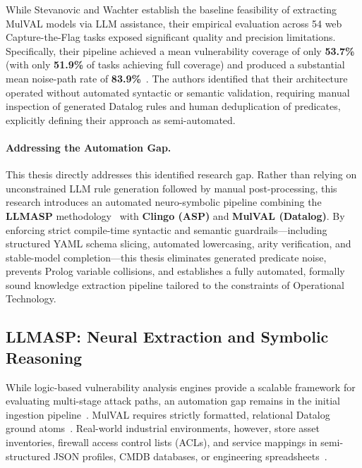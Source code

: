 \documentclass[target=mst,aauheader=aics,style=]{thud}
\begin{document}
While Stevanovic and Wachter establish the baseline feasibility of extracting MulVAL models via LLM assistance, their empirical evaluation across 54 web Capture-the-Flag tasks exposed significant quality and precision limitations. Specifically, their pipeline achieved a mean vulnerability coverage of only \textbf{53.7\%} (with only \textbf{51.9\%} of tasks achieving full coverage) and produced a substantial mean noise-path rate of \textbf{83.9\%}~\cite{StevanovicWachterRAISE}. The authors identified that their architecture operated without automated syntactic or semantic validation, requiring manual inspection of generated Datalog rules and human deduplication of predicates, explicitly defining their approach as semi-automated.

\paragraph{Addressing the Automation Gap.}
This thesis directly addresses this identified research gap. Rather than relying on unconstrained LLM rule generation followed by manual post-processing, this research introduces an automated neuro-symbolic pipeline combining the \textbf{LLMASP} methodology~\cite{alviano2025llmasp} with \textbf{Clingo (ASP)} and \textbf{MulVAL (Datalog)}. By enforcing strict compile-time syntactic and semantic guardrails---including structured YAML schema slicing, automated lowercasing, arity verification, and stable-model completion---this thesis eliminates generated predicate noise, prevents Prolog variable collisions, and establishes a fully automated, formally sound knowledge extraction pipeline tailored to the constraints of Operational Technology.

\subsection{LLMASP: Neural Extraction and Symbolic Reasoning}
\label{sec:llmasp_integration}
While logic-based vulnerability analysis engines provide a scalable framework for evaluating multi-stage attack paths, an automation gap remains in the initial ingestion pipeline~\cite{KonstaSurvey, StevanovicWachterRAISE}. MulVAL requires strictly formatted, relational Datalog ground atoms~\cite{Ou05}. Real-world industrial environments, however, store asset inventories, firewall access control lists (ACLs), and service mappings in semi-structured JSON profiles, CMDB databases, or engineering spreadsheets~\cite{SunderOT}.
\end{document}
